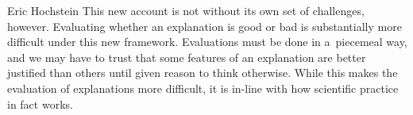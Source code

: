 \begin{artengenv}{Eric Hochstein}
This new account is not without its own set of challenges, however. Evaluating whether an explanation is good or bad is substantially more difficult under this new framework. Evaluations must be done in a~piecemeal way, and we may have to trust that some features of an explanation are better justified than others until given reason to think otherwise. While this makes the evaluation of explanations more difficult, it is in-line with how scientific practice in fact works.

\end{artengenv}
